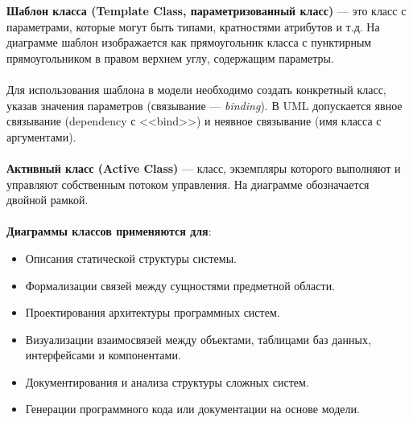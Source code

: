 \documentclass[a4paper, 12pt]{report}
\numberwithin{equation}{section}
\begin{document}
\textbf{Шаблон класса (Template Class, параметризованный класс)} — это класс с параметрами, которые могут быть типами, кратностями атрибутов и т.д. На диаграмме шаблон изображается как прямоугольник класса с пунктирным прямоугольником в правом верхнем углу, содержащим параметры.
\\\\
Для использования шаблона в модели необходимо создать конкретный класс, указав значения параметров (связывание — \textit{binding}). В UML допускается явное связывание (dependency с <<bind>>) и неявное связывание (имя класса с аргументами).
\\\\
\textbf{Активный класс (Active Class)} — класс, экземпляры которого выполняют и управляют собственным потоком управления. На диаграмме обозначается двойной рамкой.
\\\\
\textbf{Диаграммы классов применяются для}:
\begin{itemize}
    \item Описания статической структуры системы.
    \item Формализации связей между сущностями предметной области.
    \item Проектирования архитектуры программных систем.
    \item Визуализации взаимосвязей между объектами, таблицами баз данных, интерфейсами и компонентами.
    \item Документирования и анализа структуры сложных систем.
    \item Генерации программного кода или документации на основе модели.
\end{itemize}
\end{document}
